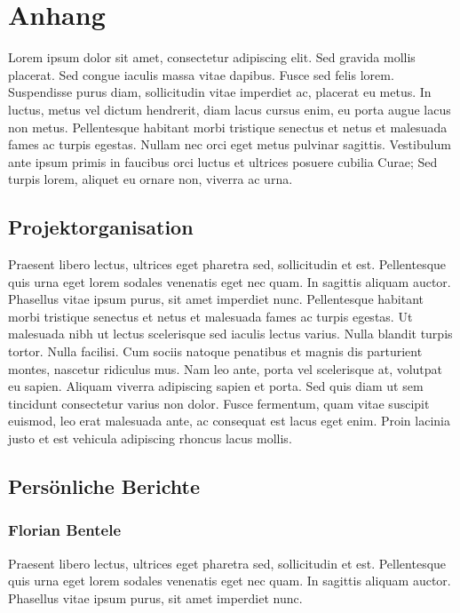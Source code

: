 \chapter{Anhang}

Lorem ipsum dolor sit amet, consectetur adipiscing elit. Sed gravida mollis placerat. Sed congue iaculis massa vitae dapibus. Fusce sed felis lorem. Suspendisse purus diam, sollicitudin vitae imperdiet ac, placerat eu metus. In luctus, metus vel dictum hendrerit, diam lacus cursus enim, eu porta augue lacus non metus. Pellentesque habitant morbi tristique senectus et netus et malesuada fames ac turpis egestas. Nullam nec orci eget metus pulvinar sagittis. Vestibulum ante ipsum primis in faucibus orci luctus et ultrices posuere cubilia Curae; Sed turpis lorem, aliquet eu ornare non, viverra ac urna.

\section{Projektorganisation}

Praesent libero lectus, ultrices eget pharetra sed, sollicitudin et est. Pellentesque quis urna eget lorem sodales venenatis eget nec quam. In sagittis aliquam auctor. Phasellus vitae ipsum purus, sit amet imperdiet nunc. Pellentesque habitant morbi tristique senectus et netus et malesuada fames ac turpis egestas. Ut malesuada nibh ut lectus scelerisque sed iaculis lectus varius. Nulla blandit turpis tortor. Nulla facilisi. Cum sociis natoque penatibus et magnis dis parturient montes, nascetur ridiculus mus. Nam leo ante, porta vel scelerisque at, volutpat eu sapien. Aliquam viverra adipiscing sapien et porta. Sed quis diam ut sem tincidunt consectetur varius non dolor. Fusce fermentum, quam vitae suscipit euismod, leo erat malesuada ante, ac consequat est lacus eget enim. Proin lacinia justo et est vehicula adipiscing rhoncus lacus mollis.

\section{Persönliche Berichte}

\subsection{Florian Bentele}
Praesent libero lectus, ultrices eget pharetra sed, sollicitudin et est. Pellentesque quis urna eget lorem sodales venenatis eget nec quam. In sagittis aliquam auctor. Phasellus vitae ipsum purus, sit amet imperdiet nunc. 

